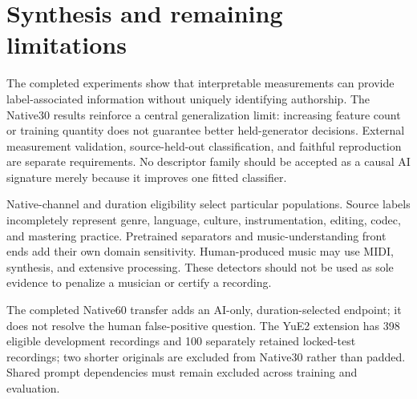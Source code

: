 \documentclass[11pt,a4paper]{article}
\begin{document}
\section{Synthesis and remaining limitations}
The completed experiments show that interpretable measurements can provide
label-associated information without uniquely identifying authorship. The
Native30 results reinforce a central generalization limit: increasing feature
count or training quantity does not guarantee better held-generator decisions.
External measurement validation, source-held-out classification, and faithful
reproduction are separate requirements. No descriptor family should be accepted
as a causal AI signature merely because it improves one fitted classifier.

Native-channel and duration eligibility select particular populations. Source
labels incompletely represent genre, language, culture, instrumentation, editing,
codec, and mastering practice. Pretrained separators and music-understanding
front ends add their own domain sensitivity. Human-produced music may use MIDI,
synthesis, and extensive processing. These detectors should not be used as sole
evidence to penalize a musician or certify a recording.

The completed Native60 transfer adds an AI-only, duration-selected endpoint;
it does not resolve the human false-positive question. The YuE2 extension has
398 eligible development recordings and 100 separately retained locked-test
recordings; two shorter originals are excluded from Native30 rather than padded.
Shared prompt dependencies must remain excluded across training and evaluation.



\end{document}
